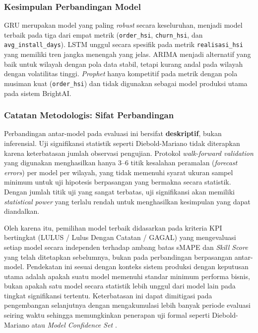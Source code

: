 \subsubsection{Kesimpulan Perbandingan Model}

GRU merupakan model yang paling \textit{robust} secara keseluruhan, menjadi model terbaik pada tiga dari empat metrik (\texttt{order\_}\allowbreak\texttt{hsi}, \texttt{churn\_}\allowbreak\texttt{hsi}, dan \texttt{avg\_}\allowbreak\texttt{install\_}\allowbreak\texttt{days}). LSTM unggul secara spesifik pada metrik \texttt{realisasi\_}\allowbreak\texttt{hsi} yang memiliki tren jangka menengah yang jelas. ARIMA menjadi alternatif yang baik untuk wilayah dengan pola data stabil, tetapi kurang andal pada wilayah dengan volatilitas tinggi. \textit{Prophet} hanya kompetitif pada metrik dengan pola musiman kuat (\texttt{order\_}\allowbreak\texttt{hsi}) dan tidak digunakan sebagai model produksi utama pada sistem BrightAI.

\subsubsection{Catatan Metodologis: Sifat Perbandingan}

Perbandingan antar-model pada evaluasi ini bersifat \textbf{deskriptif}, bukan inferensial. Uji signifikansi statistik seperti Diebold-Mariano \cite{pypi2025diebold} tidak diterapkan karena keterbatasan jumlah observasi pengujian. Protokol \textit{walk-forward va\-li\-da\-tion} yang digunakan menghasilkan hanya 3--6 titik kesalahan peramalan (\textit{forecast errors}) per model per wilayah, yang tidak memenuhi syarat ukuran sampel minimum untuk uji hipotesis berpasangan yang bermakna secara statistik. Dengan jumlah titik uji yang sangat terbatas, uji signifikansi akan memiliki \textit{statistical power} yang terlalu rendah untuk menghasilkan kesimpulan yang dapat diandalkan.

Oleh karena itu, pemilihan model terbaik didasarkan pada kriteria KPI bertingkat (LULUS / Lulus Dengan Catatan / GAGAL) yang mengevaluasi setiap model secara independen terhadap ambang batas sMAPE dan \textit{Skill Score} yang telah ditetapkan sebelumnya, bukan pada perbandingan berpasangan antar-model. Pendekatan ini sesuai dengan konteks sistem produksi dengan keputusan utama adalah apakah suatu model memenuhi standar minimum performa bisnis, bukan apakah satu model secara statistik lebih unggul dari model lain pada tingkat signifikansi tertentu. Keterbatasan ini dapat dimitigasi pada pengembangan selanjutnya dengan mengakumulasi lebih banyak periode evaluasi seiring waktu sehingga memungkinkan penerapan uji formal seperti Diebold-Mariano atau \textit{Model Confidence Set} \cite{arch2025mcs}.


